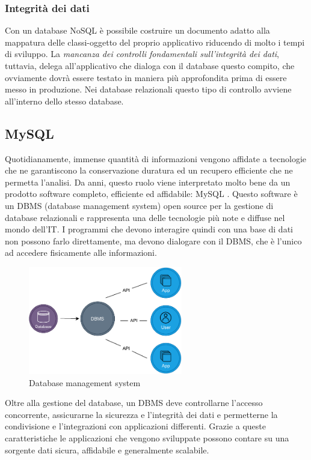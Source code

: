 \subsubsection{Integrità dei dati}
Con un database NoSQL è possibile costruire un documento adatto alla mappatura delle classi-oggetto del proprio applicativo riducendo di molto i tempi di sviluppo. La \textit{mancanza dei controlli fondamentali sull'integrità dei dati}, tuttavia, delega all'applicativo che dialoga con il database questo compito, che ovviamente dovrà essere testato in maniera più approfondita prima di essere messo in produzione. Nei database relazionali questo tipo di controllo avviene all'interno dello stesso database. 

\subsection{MySQL}
Quotidianamente, immense quantità di informazioni vengono affidate a tecnologie che ne garantiscono la conservazione duratura ed un recupero efficiente che ne permetta l’analisi. Da anni, questo ruolo viene interpretato molto bene da un prodotto software completo, efficiente ed affidabile: MySQL \cite{site:mysql} . Questo software è un DBMS (database management system) open source per la gestione di database relazionali e rappresenta una delle tecnologie più note e diffuse nel mondo dell'IT. I programmi che devono interagire quindi con una base di dati non possono farlo direttamente, ma devono dialogare con il DBMS, che è l’unico ad accedere fisicamente alle informazioni.
\begin{figure}[H]
    \centering
    \includegraphics[width=0.60\textwidth]{images/01_6_dbms.pdf}
    \caption{Database management system}
    \label{fig:databasemanagementsystem}
\end{figure}
Oltre alla gestione del database, un DBMS deve controllarne l'accesso concorrente, assicurarne la sicurezza e l'integrità dei dati e permetterne la condivisione e l'integrazioni con applicazioni differenti. Grazie a queste caratteristiche le applicazioni che vengono sviluppate possono contare su una sorgente dati sicura, affidabile e generalmente scalabile.

